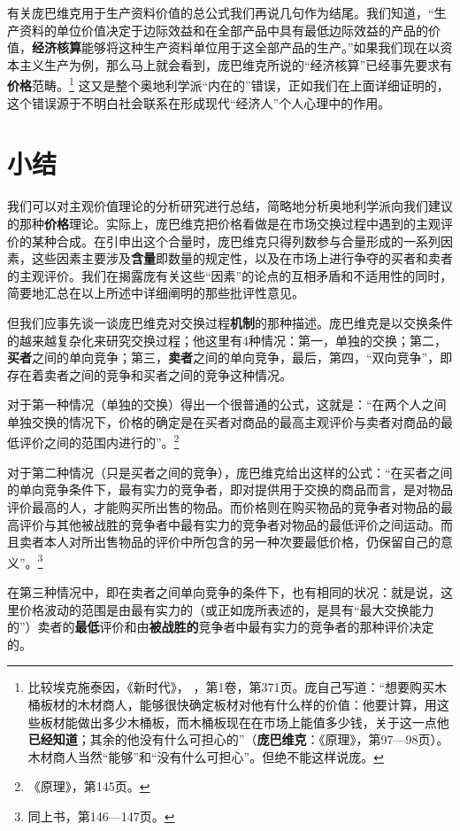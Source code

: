 \documentclass[fontset=fandol, a4paper, 12pt, openright]{ctexbook}
\newcommand{\RN}[1]{%
  \textup{\uppercase\expandafter{\romannumeral#1}}%
}
\begin{document}
有关庞巴维克用于生产资料价值的总公式我们再说几句作为结尾。我们知道，“生产资料的单位价值决定于边际效益和在全部产品中具有最低边际效益的产品的价值，\textbf{经济核算}能够将这种生产资料单位用于这全部产品的生产。”如果我们现在以资本主义生产为例，那么马上就会看到，庞巴维克所说的“经济核算”已经事先要求有\textbf{价格}范畴。\footnote{比较埃克施泰因，《新时代》，\RN{28}，第1卷，第371页。庞自己写道：“想要购买木桶板材的木材商人，能够很快确定板材对他有什么样的价值：他要计算，用这些板材能做出多少木桶板，而木桶板现在在市场上能值多少钱，关于这一点他\textbf{已经知道}；其余的他没有什么可担心的”（\textbf{庞巴维克}：《原理》，第97—98页）。木材商人当然“能够”和“没有什么可担心”。但绝不能这样说庞。} 这又是整个奥地利学派“内在的”错误，正如我们在上面详细证明的，这个错误源于不明白社会联系在形成现代“经济人”个人心理中的作用。

\section{小结}

我们可以对主观价值理论的分析研究进行总结，简略地分析奥地利学派向我们建议的那种\textbf{价格}理论。实际上，庞巴维克把价格看做是在市场交换过程中遇到的主观评价的某种合成。在引申出这个合量时，庞巴维克只得列数参与合量形成的一系列因素，这些因素主要涉及\textbf{含量}即数量的规定性，以及在市场上进行争夺的买者和卖者的主观评价。我们在揭露庞有关这些“因素”的论点的互相矛盾和不适用性的同时，简要地汇总在以上所述中详细阐明的那些批评性意见。

但我们应事先谈一谈庞巴维克对交换过程\textbf{机制}的那种描述。庞巴维克是以交换条件的越来越复杂化来研究交换过程；他这里有4种情况：第一，单独的交换；第二，\textbf{买者}之间的单向竞争；第三，\textbf{卖者}之间的单向竞争，最后，第四，“双向竞争”，即存在着卖者之间的竞争和买者之间的竞争这种情况。

对于第一种情况（单独的交换）得出一个很普通的公式，这就是：“在两个人之间单独交换的情况下，价格的确定是在买者对商品的最高主观评价与卖者对商品的最低评价之间的范围内进行的”。\footnote{《原理》，第145页。}

对于第二种情况（只是买者之间的竞争），庞巴维克给出这样的公式：“在买者之间的单向竞争条件下，最有实力的竞争者，即对提供用于交换的商品而言，是对物品评价最高的人，才能购买所出售的物品。而价格则在购买物品的竞争者对物品的最高评价与其他被战胜的竞争者中最有实力的竞争者对物品的最低评价之间运动。而且卖者本人对所出售物品的评价中所包含的另一种次要最低价格，仍保留自己的意义”。\footnote{同上书，第146—147页。}

在第三种情况中，即在卖者之间单向竞争的条件下，也有相同的状况：就是说，这里价格波动的范围是由最有实力的（或正如庞所表述的，是具有“最大交换能力的”）卖者的\textbf{最低}评价和由\textbf{被战胜的}竞争者中最有实力的竞争者的那种评价决定的。
\end{document}
